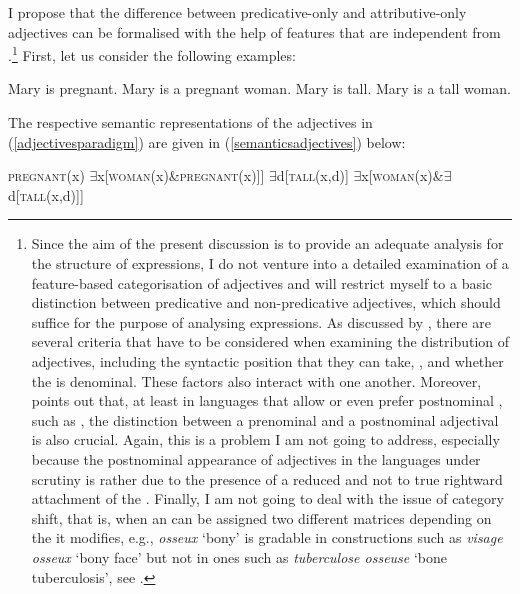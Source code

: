 I propose that the difference between predicative-only and attributive-only adjectives can be formalised with the help of features that are independent from .\footnote{Since the aim of the present discussion is to provide an adequate analysis for the structure of  expressions, I do not venture into a detailed examination of a feature-based categorisation of adjectives and will restrict myself to a basic distinction between predicative and non-predicative adjectives, which should suffice for the purpose of analysing  expressions. As discussed by \citet{fradin2007}, there are several criteria that have to be considered when examining the distribution of adjectives, including the syntactic position that they can take, , and whether the  is denominal. These factors also interact with one another. Moreover, \citet{fradin2007} points out that, at least in languages that allow or even prefer postnominal , such as , the distinction between a prenominal and a postnominal adjectival  is also crucial. Again, this is a problem I am not going to address, especially because the postnominal appearance of adjectives in the languages under scrutiny is rather due to the presence of a reduced  and not to true rightward attachment of the  . Finally, I am not going to deal with the issue of category shift, that is, when an  can be assigned two different  matrices depending on the  it modifies, e.g., \textit{osseux} `bony' is gradable in constructions such as \textit{visage osseux} `bony face' but not in ones such as \textit{tuberculose osseuse} `bone tuberculosis', see \citet[84--85]{fradin2007}.} First, let us consider the following examples:

\ea \label{adjectivesparadigm}
\ea	Mary is pregnant.
\ex	Mary is a pregnant woman.
\ex	Mary is tall.
\ex	Mary is a tall woman.
\z
\z

The respective semantic representations of the adjectives in (\ref{adjectivesparadigm}) are given in (\ref{semanticsadjectives}) below:

\ea \label{semanticsadjectives}
\ea	\upshape \textsc{pregnant}(x) \label{pregnant}
\ex	\upshape $\exists$x[\textsc{woman}(x)\&\textsc{pregnant}(x)]] \label{girlpregnant}
\ex	\upshape $\exists$d[\textsc{tall}(x,d)] \label{tall}
\ex	\upshape $\exists$x[\textsc{woman}(x)\&$\exists$d[\textsc{tall}(x,d)]] \label{girltall}
\z
\z

